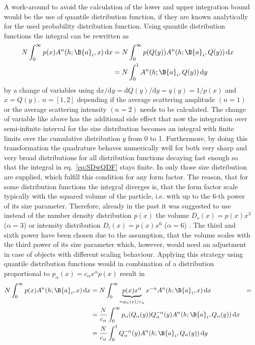 A work-around to avoid the calculation of the lower and upper integration bound would be the use of quantile distribution function, if they are known analytically for the used probability distribution function. Using quantile distribution functions the integral can be rewritten as
\begin{align}\label{eq:SDwQDF}
  N \int_0^\infty p(x) A^n(h;\B{a}_i,x)\, \mathrm{d}x & = N \int_0^\infty p(Q(y)) A^n(h;\B{a}_i,Q(y)) \, \mathrm{d}x \\
   & = N \int_0^1 A^n(h;\B{a}_i,Q(y)) \, \mathrm{d}y
\end{align}
by a change of variables using $\mathrm{d}x/\mathrm{d}y=\mathrm{d}Q(y)/\mathrm{d}y=q(y)=1/p(x)$ and $x=Q(y)$. $n=[1,2]$ depending if the average scattering amplitude $(n=1)$ or the average scattering intensity $(n=2)$ needs to be calculated. The change of variable like above has the additional side effect that now the integration over semi-infinite interval for the size distribution becomes an integral with finite limits over the cumulative  distribution $y$ from 0 to 1. Furthermore, by doing this transformation the quadrature behaves numerically well for both very sharp and very broad distributions for all distribution functions decaying fast enough so that the integral in eq.\ \ref{eq:SDwQDF} stays finite. In \SASfit only those size distribution are supplied, which fulfill this condition for any form factor. The reason, that for some distribution functions  the integral diverges is, that the form factor scale typically with the squared volume of the particle, i.e. with up to the 6-th power of its size parameter. Therefore, already in the past it was suggested to use instead of the number density distribution $p(x)$ the volume $D_v(x)=p(x)x^3$ ($\alpha=3$) or intensity distribution $D_i(x)=p(x)x^6$ ($\alpha=6$) \cite{Glatter1980}. The third and sixth power have been chosen due to the assumption, that the volume scales with the third power of its size parameter which, however, would need an adjustment in case of objects with different scaling behaviour.
Applying this strategy using quantile distribution functions would in combination of a distribution proportional to $p_\alpha(x) = c_\alpha x^\alpha p(x)$ result in
\begin{align}\label{eq:intensity_alpha_quantile}
N  \int_0^\infty p(x) A^n(h;\B{a}_i,x)\, \mathrm{d}x & = N \int_0^\infty \underbrace{p(x) x^\alpha}_{=p_\alpha(x)/c_\alpha} x^{-\alpha} A^n(h;\B{a}_i,x)\, \mathrm{d}x & = \\
   &= \frac{N}{c_\alpha}\int_0^\infty p_\alpha(Q_\alpha(y)) Q^{-\alpha}_\alpha(y) A^n(h;\B{a}_i,Q_\alpha(y))\, \mathrm{d}x\\
   &= \frac{N}{c_\alpha} \int_0^1 Q^{-\alpha}_\alpha(y) A^n(h;\B{a}_i,Q_\alpha(y))\, \mathrm{d}y \label{eq:QDFsd}
\end{align}
